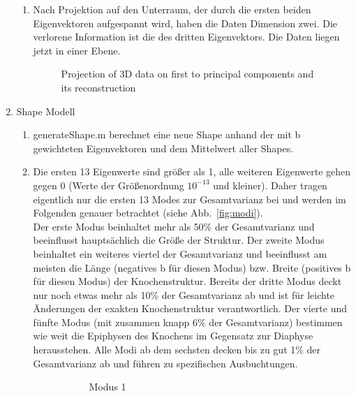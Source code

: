 \documentclass[]{report}
\newlength\figureheight
\newlength\figurewidth
\begin{document}
\begin{enumerate}
\begin{enumerate}
			\item
			Nach Projektion auf den Unterraum, der durch die ersten beiden Eigenvektoren aufgespannt wird, haben die Daten Dimension zwei. Die verlorene Information ist die des dritten Eigenvektors. Die Daten liegen jetzt in einer Ebene.
			\setlength\figureheight{10cm}
			\begin{figure}[tbp!]
				\centering
				
				\caption{Projection of 3D data on first to principal components and its reconstruction} 
				\label{fig:3D projection and reconstruction}
			\end{figure}
		\end{enumerate}
		
		\item Shape Modell
		\begin{enumerate}
			\item
			generateShape.m berechnet eine neue Shape anhand der mit b gewichteten Eigenvektoren und dem Mittelwert aller Shapes.
			\item %
			Die ersten 13 Eigenwerte sind größer als 1, alle weiteren Eigenwerte gehen gegen 0 (Werte der Größenordnung $10^{-13}$ und kleiner). Daher tragen eigentlich nur die ersten 13 Modes zur Gesamtvarianz bei und werden im Folgenden genauer betrachtet (siehe Abb.~\ref{fig:modi}).\\
			Der erste Modus beinhaltet mehr als 50\% der Gesamtvarianz und beeinflusst hauptsächlich die Größe der Struktur.
			Der zweite Modus beinhaltet ein weiteres viertel der Gesamtvarianz und beeinflusst am meisten die Länge (negatives b für diesen Modus) bzw. Breite (positives b für diesen Modus) der Knochenstruktur.
			Bereits der dritte Modus deckt nur noch etwas mehr als 10\% der Gesamtvarianz ab und ist für leichte Änderungen der exakten Knochenstruktur verantwortlich.
			Der vierte und fünfte Modus (mit zusammen knapp 6\% der Gesamtvarianz) bestimmen wie weit die Epiphysen des Knochens im Gegensatz zur Diaphyse herausstehen.
			Alle Modi ab dem sechsten decken bis zu gut 1\% der Gesamtvarianz ab und führen zu spezifischen Ausbuchtungen.
			\setlength\figureheight{4cm}
			\setlength{}
			\begin{figure}[tbp!]
				\begin{subfigure}{0.3\textwidth}
					\centering
					
					\caption{Modus 1}
					\label{fig:mode1}
				\end{subfigure}
				\quad
				\begin{subfigure}{0.3\textwidth}

\end{subfigure}
\end{figure}
\end{enumerate}
\end{enumerate}
\end{document}
